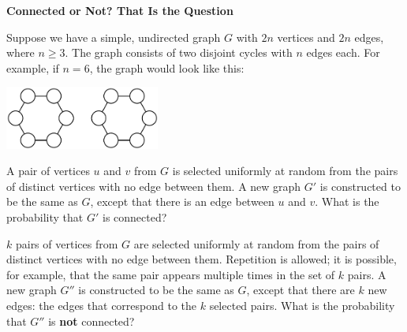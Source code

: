 \documentclass[12pt,oneside]{article}
\newcommand{\ptitle}[1]{\textbf{\hspace{0.2cm}#1}}
\begin{document}
\newpage
\begin{problem}{15} \label{graphprob} \ptitle{Connected or Not? That Is the Question}

Suppose we have a simple, undirected graph $G$ with $2n$ vertices and $2n$ edges, where $n \geq 3$.  The graph consists of two disjoint cycles with $n$ edges each.  For example, if $n=6$, the graph would look like this:

\vspace{12pt}
\centerline{\includegraphics[width=2in]{disconnected-graph}}
\vspace{12pt}

\bparts
{}
A pair of vertices $u$ and $v$ from $G$ is selected uniformly at random from the pairs of distinct vertices with no edge between them.  A new graph $G'$ is constructed to be the same as $G$, except that there is an edge between $u$ and $v$.  What is the probability that $G'$ is connected?



$k$ pairs of vertices from $G$ are selected uniformly at random from the pairs of distinct vertices with no edge between them. %
 Repetition is allowed; it is possible, for example, that the same pair appears multiple times in the set of $k$ pairs.  A new graph $G''$ is constructed to be the same as $G$, except that there are $k$ new edges: the edges that correspond to the $k$ selected pairs. What is the probability that $G''$ is {\bf not} connected?


\end{problem}
\end{document}
